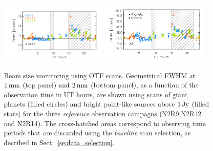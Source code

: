 \begin{figure}[ht!]
  \begin{center}
    \includegraphics[clip=true, trim={0.9cm, 0.5cm, 0.5cm, 0.5cm}, width=0.4725\textwidth]{Figures/Beam_monitoring_with_otfs_vs_ut_1mm.pdf}
    \includegraphics[clip=true, trim={0.5cm, 0.5cm, 0.5cm, 0.5cm}, width=0.4875\textwidth]{Figures/Beam_monitoring_with_otfs_vs_ut_a2.pdf}
    \caption[Beam size monitoring using OTF scans]{Beam size
      monitoring using OTF scans. Geometrical FWHM at $1\,\rm{mm}$ (top panel)
      and $2\,\rm{mm}$ (bottom panel), as a function of the
      observation time in UT hours, are shown using scans of giant
      planets (filled circles) and bright point-like sources above
      $1\,\rm{Jy}$ (filled stars) for the three \emph{reference}
      observation campagns (N2R9,N2R12 and N2R14). The cross-hatched areas
      correspond to observing time periods that are discarded using
      the \emph{baseline} scan selection, as decribed in Sect.~\ref{se:data_selection}.} 
\label{fig:beam_monitoring_otf}
  \end{center}
\end{figure}

